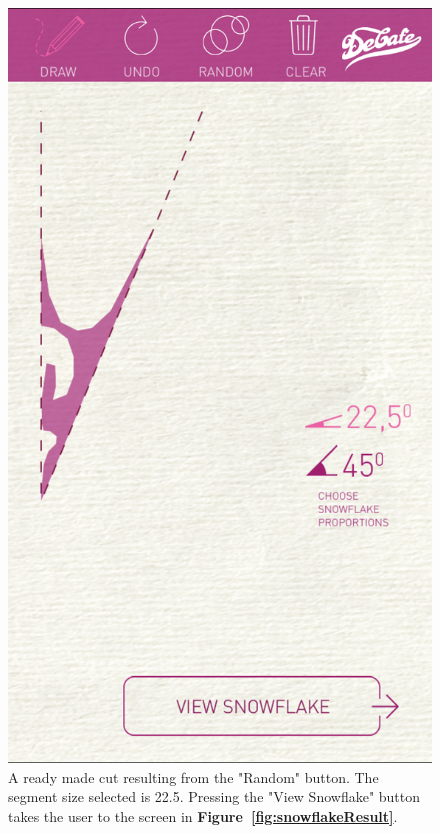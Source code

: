 \documentclass[11pt]{article}
\begin{document}
                    \begin{figure}[!ht]
                        \begin{minipage}{0.45\textwidth}
                            \centering \includegraphics[width=0.7\linewidth]{Images/snowflakeSegmentCut}
                            \caption{A ready made cut resulting from the "Random" button. The segment size selected is 22.5\textdegree{}. Pressing the "View Snowflake" button takes the user to the screen in \textbf{Figure~\ref{fig:snowflakeResult}}.\\}
                            \label{fig:snowflakeSegmentCut}
                        \end{minipage}\hfill
                        \begin{minipage}{0.45\textwidth}
                            \centering

\end{minipage}
\end{figure}
\end{document}
